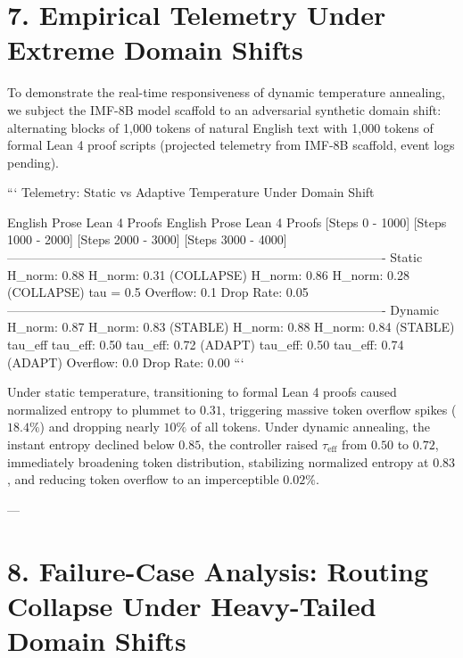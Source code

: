 \documentclass[11pt,twoside,openright]{amsbook}
\begin{document}
{{{{{{{{{{\section{7. Empirical Telemetry Under Extreme Domain Shifts}

To demonstrate the real-time responsiveness of dynamic temperature annealing, we subject the IMF-8B model scaffold to an adversarial synthetic domain shift: alternating blocks of 1,000 tokens of natural English text with 1,000 tokens of formal Lean 4 proof scripts (projected telemetry from IMF-8B scaffold, event logs pending).

```
                      Telemetry: Static vs Adaptive Temperature Under Domain Shift
                                                  
         English Prose           Lean 4 Proofs           English Prose           Lean 4 Proofs
         [Steps 0 - 1000]       [Steps 1000 - 2000]     [Steps 2000 - 3000]     [Steps 3000 - 4000]
         -------------------------------------------------------------------------------------------
Static   H_norm: 0.88            H_norm: 0.31 (COLLAPSE) H_norm: 0.86            H_norm: 0.28 (COLLAPSE)
tau = 0.5 Overflow: 0.1%
         Drop Rate: 0.05%
         -------------------------------------------------------------------------------------------
Dynamic  H_norm: 0.87            H_norm: 0.83 (STABLE)   H_norm: 0.88            H_norm: 0.84 (STABLE)
tau_eff  tau_eff: 0.50           tau_eff: 0.72 (ADAPT)   tau_eff: 0.50           tau_eff: 0.74 (ADAPT)
         Overflow: 0.0%
         Drop Rate: 0.00%
```

Under static temperature, transitioning to formal Lean 4 proofs caused normalized entropy to plummet to $0.31$, triggering massive token overflow spikes ($18.4\%$) and dropping nearly $10\%$ of all tokens.
Under dynamic annealing, the instant entropy declined below $0.85$, the controller raised $\tau_{\text{eff}}$ from $0.50$ to $0.72$, immediately broadening token distribution, stabilizing normalized entropy at $0.83$, and reducing token overflow to an imperceptible $0.02\%$.

---

\section{8. Failure-Case Analysis: Routing Collapse Under Heavy-Tailed Domain Shifts}

}}}}}}}}}}
\end{document}
